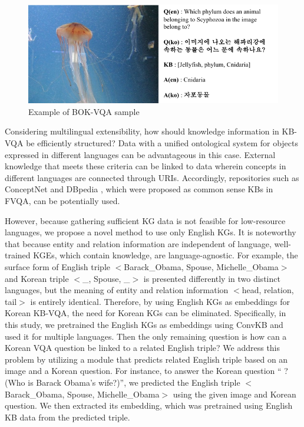 \documentclass[letterpaper]{article} %
\begin{document}
\begin{figure}[t]
\includegraphics[width=\linewidth]{data_images/data_example.pdf}
\caption{Example of BOK-VQA sample}
\label{fig:fig1}
\end{figure}

Considering multilingual extensibility, how should knowledge information in KB-VQA be efficiently structured? Data with a unified ontological system for objects expressed in different languages can be advantageous in this case. External knowledge that meets these criteria can be linked to data wherein concepts in different languages are connected through URIs. Accordingly, repositories such as ConceptNet \cite{speer2017conceptnet} and DBpedia \cite{auer2007dbpedia, lehmann2015dbpedia}, which were proposed as common sense KBs in FVQA, can be potentially used.

However, because gathering sufficient KG data is not feasible for low-resource languages, we propose a novel method to use only English KGs. It is noteworthy that because entity and relation information are independent of language, well-trained KGEs, which contain knowledge, are language-agnostic. For example, the surface form of English triple $<$Barack\_Obama, Spouse, Michelle\_Obama$>$ and Korean triple $<$\_, Spouse, \_$>$ is presented differently in two distinct languages, but the meaning of entity and relation information $<$head, relation, tail$>$ is entirely identical. Therefore, by using English KGs as embeddings for Korean KB-VQA, the need for Korean KGs can be eliminated. Specifically, in this study, we pretrained the English KGs as embeddings using ConvKB \cite{nguyen2018novel} and used it for multiple languages. Then the only remaining question is how can a Korean VQA question be linked to a related English triple? We address this problem by utilizing a module that predicts related English triple based on an image and a Korean question. For instance, to answer the Korean question ``  ? (Who is Barack Obama's wife?)'', we predicted the English triple $<$Barack\_Obama, Spouse, Michelle\_Obama$>$ using the given image and Korean question. We then extracted its embedding, which was pretrained using English KB data from the predicted triple.
\end{document}
